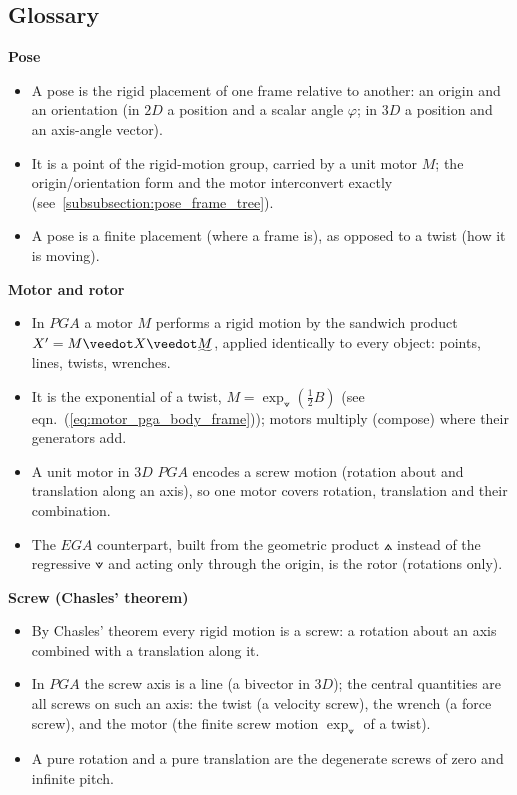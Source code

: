 \subsection{Glossary}
\label{subsection_glossary}

\textbf{Pose}
\begin{itemize}
    \item A pose is the rigid placement of one frame relative to another: an origin and an
    orientation (in $2D$ a position and a scalar angle $\varphi$; in $3D$ a position and
    an axis-angle vector).

    \item It is a point of the rigid-motion group, carried by a unit motor $M$; the
    origin/orientation form and the motor interconvert exactly
    (see~\ref{subsubsection:pose_frame_tree}).

    \item A pose is a finite placement (where a frame is), as opposed to a twist (how it
    is moving).
\end{itemize}

\textbf{Motor and rotor}
\begin{itemize}
    \item In $PGA$ a motor $M$ performs a rigid motion by the sandwich product $X' = M
    \veedot X \veedot \rrev{M}$, applied identically to every object: points, lines,
    twists, wrenches.

    \item It is the exponential of a twist, $M = \exp_\veedot(\frac{1}{2} B)$ (see
    eqn.~(\ref{eq:motor_pga_body_frame})); motors multiply (compose) where their
    generators add.

    \item A unit motor in $3D$ $PGA$ encodes a screw motion (rotation about and
    translation along an axis), so one motor covers rotation, translation and their
    combination.

    \item The $EGA$ counterpart, built from the geometric product $\wedgedot$ instead of
    the regressive $\veedot$ and acting only through the origin, is the rotor (rotations
    only).
\end{itemize}

\textbf{Screw (Chasles' theorem)}
\begin{itemize}
    \item By Chasles' theorem every rigid motion is a screw: a rotation about an axis
    combined with a translation along it.

    \item In $PGA$ the screw axis is a line (a bivector in $3D$); the central quantities
    are all screws on such an axis: the twist (a velocity screw), the wrench (a force
    screw), and the motor (the finite screw motion $\exp_\veedot$ of a twist).

    \item A pure rotation and a pure translation are the degenerate screws of zero and
    infinite pitch.
\end{itemize}

